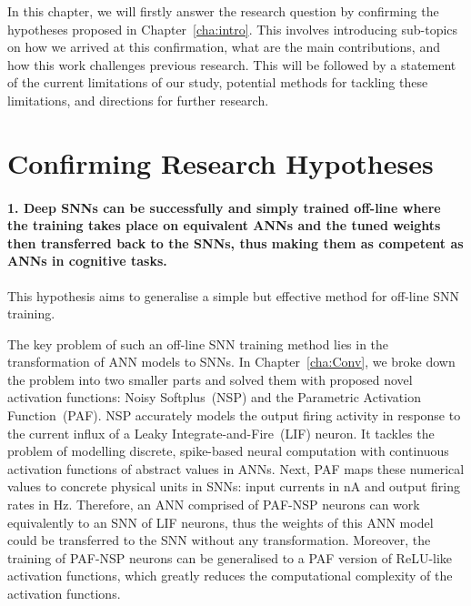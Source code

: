 In this chapter, we will firstly answer the research question by confirming the hypotheses proposed in Chapter~\ref{cha:intro}.
This involves introducing sub-topics on how we arrived at this confirmation, what are the main contributions, and how this work challenges previous research.
This will be followed by a statement of the current limitations of our study, potential methods for tackling these limitations, and directions for further research.



\section{Confirming Research Hypotheses}
\paragraph{1. Deep SNNs can be successfully and simply trained off-line where the training takes place on equivalent ANNs and the tuned weights then transferred back to the SNNs, thus making them as competent as ANNs in cognitive tasks.}
This hypothesis aims to generalise a simple but effective method for off-line SNN training.

The key problem of such an off-line SNN training method lies in the transformation of ANN models to SNNs.
In Chapter~\ref{cha:Conv}, we broke down the problem into two smaller parts and solved them with proposed novel activation functions: Noisy Softplus~(NSP) and the Parametric Activation Function~(PAF).
NSP accurately models the output firing activity in response to the current influx of a Leaky Integrate-and-Fire~(LIF) neuron.
It tackles the problem of modelling discrete, spike-based neural computation with continuous activation functions of abstract values in ANNs.
Next, PAF maps these numerical values to concrete physical units in SNNs: input currents in nA and output firing rates in Hz.
Therefore, an ANN comprised of PAF-NSP neurons can work equivalently to an SNN of LIF neurons, thus the weights of this ANN model could be transferred to the SNN without any transformation.
Moreover, the training of PAF-NSP neurons can be generalised to a PAF version of ReLU-like activation functions, which greatly reduces the computational complexity of the activation functions.

